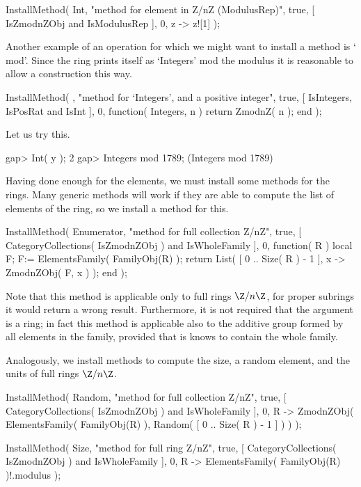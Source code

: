 \begintt
    InstallMethod( Int,
        "method for element in Z/nZ (ModulusRep)",
        true,
        [ IsZmodnZObj and IsModulusRep ], 0,
        z -> z![1] );
\endtt

Another example of an operation for which we might want to install
a method is `\\mod'.
Since the ring prints itself as `Integers' mod the modulus
it is reasonable to allow a construction this way.

\begintt
    InstallMethod( \mod,
        "method for `Integers', and a positive integer",
        true,
        [ IsIntegers, IsPosRat and IsInt ], 0,
        function( Integers, n ) return ZmodnZ( n ); end );
\endtt

Let us try this.

\begintt
    gap> Int( y );
    2
    gap> Integers mod 1789;
    (Integers mod 1789)
\endtt

Having done enough for the elements,
we must install some methods for the rings.
Many generic methods will work if they are able to compute the
list of elements of the ring,
so we install a method for this.

\begintt
    InstallMethod( Enumerator,
        "method for full collection Z/nZ",
        true,
        [ CategoryCollections( IsZmodnZObj ) and IsWholeFamily ], 0,
        function( R )
        local F;
        F:= ElementsFamily( FamilyObj(R) );
        return List( [ 0 .. Size( R ) - 1 ], x -> ZmodnZObj( F, x ) );
        end );
\endtt

Note that this method is applicable only to full rings $\Z/n\Z$,
for proper subrings it would return a wrong result.
Furthermore, it is not required that the argument is a ring;
in fact this method is applicable also to the additive group
formed by all elements in the family,
provided that is knows to contain the whole family.

Analogously, we install methods to compute the size,
a random element, and the units of full rings $\Z/n\Z$.

\begintt
    InstallMethod( Random,
        "method for full collection Z/nZ",
        true,
        [ CategoryCollections( IsZmodnZObj ) and IsWholeFamily ], 0,
        R -> ZmodnZObj( ElementsFamily( FamilyObj(R) ),
                        Random( [ 0 .. Size( R ) - 1 ] ) ) );

    InstallMethod( Size,
        "method for full ring Z/nZ",
        true,
        [ CategoryCollections( IsZmodnZObj ) and IsWholeFamily ], 0,
        R -> ElementsFamily( FamilyObj(R) )!.modulus );


